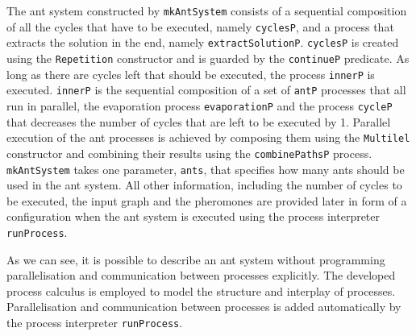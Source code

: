 The ant system constructed by \texttt{mkAntSystem} consists of a sequential composition of all the cycles that have to be executed, namely \texttt{cyclesP}, and a process that extracts the solution in the end, namely \texttt{extractSolutionP}. \texttt{cyclesP} is created using the \texttt{Repetition} constructor and is guarded by the \texttt{continueP} predicate. As long as there are cycles left that should be executed, the process \texttt{innerP} is executed. \texttt{innerP} is the sequential composition of a set of \texttt{antP} processes that all run in parallel, the evaporation process \texttt{evaporationP} and the process \texttt{cycleP} that decreases the number of cycles that are left to be executed by 1. Parallel execution of the ant processes is achieved by composing them using the \texttt{Multilel} constructor and combining their results using the \texttt{combinePathsP} process. \texttt{mkAntSystem} takes one parameter, \texttt{ants}, that specifies how many ants should be used in the ant system. All other information, including the number of cycles to be executed, the input graph and the pheromones are provided later in form of a configuration when the ant system is executed using the process interpreter \texttt{runProcess}.

As we can see, it is possible to describe an ant system without programming parallelisation and communication between processes explicitly. The developed process calculus is employed to model the structure and interplay of processes. Parallelisation and communication between processes is added automatically by the process interpreter \texttt{runProcess}.